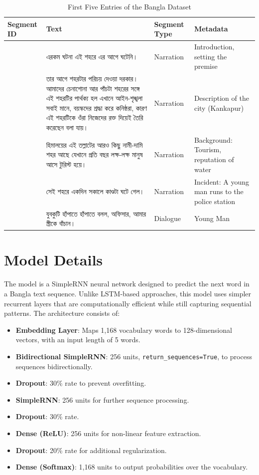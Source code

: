 \documentclass[12pt]{article}
\begin{document}
\begin{table}[H]
\centering
\caption{First Five Entries of the Bangla Dataset}
\label{tab:dataset_sample}
\begin{tabular}{|>{\raggedright\arraybackslash}p{1.5cm}|>{\raggedright\arraybackslash}p{6cm}|>{\raggedright\arraybackslash}p{2cm}|>{\raggedright\arraybackslash}p{3cm}|}
\hline
\textbf{Segment ID} & \textbf{Text} & \textbf{Segment Type} & \textbf{Metadata} \\
\hline
1 & {\bengalifont এরকম ঘটনা এই শহরে এর আগে ঘটেনি।} & Narration & Introduction, setting the premise \\
\hline
2 & {\bengalifont তার আগে শহরটার পরিচয় দেওয়া দরকার। আমাদের চেনাশোনা আর পাঁচটা শহরের সঙ্গে এই শহরটির পার্থক্য হল এখানে আইন-শৃঙ্খলা সবাই মানে, বয়স্কদের শ্রদ্ধা করে কনিষ্ঠরা, কারণ এই শহরটিকে ওঁরা নিজেদের রক্ত দিয়েই তৈরি করেছেন বলা যায়।} & Narration & Description of the city (Kankapur) \\
\hline
3 & {\bengalifont হিমালয়ের এই তল্লাটের আরও কিছু নামী-দামি শহর আছে যেখানে প্রতি বছর লক্ষ-লক্ষ মানুষ আসে টুরিস্ট হয়ে।} & Narration & Background: Tourism, reputation of water \\
\hline
4 & {\bengalifont সেই শহরে একদিন সকালে কাণ্ডটা ঘটে গেল।} & Narration & Incident: A young man runs to the police station \\
\hline
5 & {\bengalifont যুবকুটি হাঁপাতে হাঁপাতে বলল, অফিসার, আমার স্ত্রীকে বাঁচান।} & Dialogue & Young Man \\
\hline
\end{tabular}
\end{table}

\section*{Model Details}
The model is a SimpleRNN neural network designed to predict the next word in a Bangla text sequence. Unlike LSTM-based approaches, this model uses simpler recurrent layers that are computationally efficient while still capturing sequential patterns. The architecture consists of:

\begin{itemize}
    \item \textbf{Embedding Layer}: Maps 1,168 vocabulary words to 128-dimensional vectors, with an input length of 5 words.
    \item \textbf{Bidirectional SimpleRNN}: 256 units, \texttt{return\_sequences=True}, to process sequences bidirectionally.
    \item \textbf{Dropout}: 30\% rate to prevent overfitting.
    \item \textbf{SimpleRNN}: 256 units for further sequence processing.
    \item \textbf{Dropout}: 30\% rate.
    \item \textbf{Dense (ReLU)}: 256 units for non-linear feature extraction.
    \item \textbf{Dropout}: 20\% rate for additional regularization.
    \item \textbf{Dense (Softmax)}: 1,168 units to output probabilities over the vocabulary.
\end{itemize}
\end{document}
